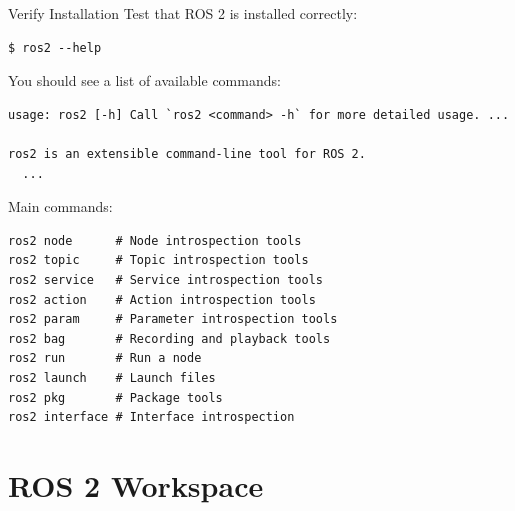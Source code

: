 \begin{frame}[fragile]{Verify Installation}
    Test that ROS 2 is installed correctly:

    \begin{lstlisting}[language=shell]
$ ros2 --help
\end{lstlisting}

    You should see a list of available commands:
    \begin{lstlisting}[language=output]
usage: ros2 [-h] Call `ros2 <command> -h` for more detailed usage. ...

ros2 is an extensible command-line tool for ROS 2.
  ...
\end{lstlisting}

    \framebreak

    Main commands:
    \begin{lstlisting}[language=syntax]
ros2 node      # Node introspection tools
ros2 topic     # Topic introspection tools
ros2 service   # Service introspection tools
ros2 action    # Action introspection tools
ros2 param     # Parameter introspection tools
ros2 bag       # Recording and playback tools
ros2 run       # Run a node
ros2 launch    # Launch files
ros2 pkg       # Package tools
ros2 interface # Interface introspection
\end{lstlisting}
\end{frame}

\section{ROS 2 Workspace}

